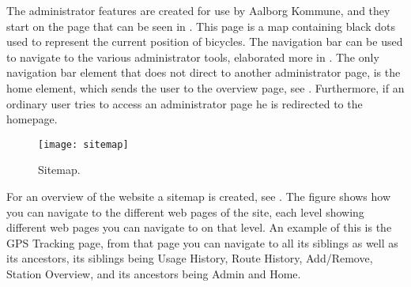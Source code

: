 The administrator features are created for use by Aalborg Kommune, and they start on the page that can be seen in .
This page is a map containing black dots used to represent the current position of bicycles.
The navigation bar can be used to navigate to the various administrator tools, elaborated more in .
The only navigation bar element that does not direct to another administrator page, is the home element, which sends the user to the overview page, see .
Furthermore, if an ordinary user tries to access an administrator page he is redirected to the homepage.

\begin{figure}[h]
	\centering
	\texttt{[image: sitemap]}
	\caption{Sitemap.}\label{fig:sitemap}
\end{figure}

For an overview of the website a sitemap is created, see .
The figure shows how you can navigate to the different web pages of the site, each level showing different web pages you can navigate to on that level.
An example of this is the GPS Tracking page, from that page you can navigate to all its siblings as well as its ancestors, its siblings being Usage History, Route History, Add/Remove, Station Overview, and its ancestors being Admin and Home.